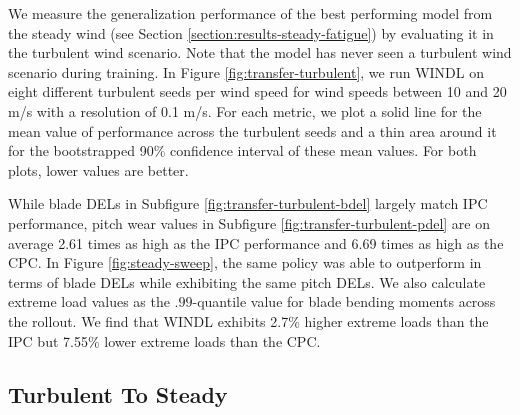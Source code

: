 We measure the generalization performance of the best performing model from the steady wind (see Section \ref{section:results-steady-fatigue}) by evaluating it in the turbulent wind scenario. Note that the model has never seen a turbulent wind scenario during training. In Figure \ref{fig:transfer-turbulent}, we run WINDL on eight different turbulent seeds per wind speed for wind speeds between 10 and 20 m/s with a resolution of 0.1 m/s. For each metric, we plot a solid line for the mean value of performance across the turbulent seeds and a thin area around it for the bootstrapped 90\% confidence interval of these mean values. For both plots, lower values are better.

While blade DELs in Subfigure \ref{fig:transfer-turbulent-bdel} largely match IPC performance, pitch wear values in Subfigure \ref{fig:transfer-turbulent-pdel} are on average 2.61 times as high as the IPC performance and 6.69 times as high as the CPC. In Figure \ref{fig:steady-sweep}, the same policy was able to outperform in terms of blade DELs while exhibiting the same pitch DELs. We also calculate extreme load values as the $.99$-quantile value for blade bending moments across the rollout. We find that WINDL exhibits 2.7\% higher extreme loads than the IPC but 7.55\% lower extreme loads than the CPC. 

\subsection{Turbulent To Steady}

